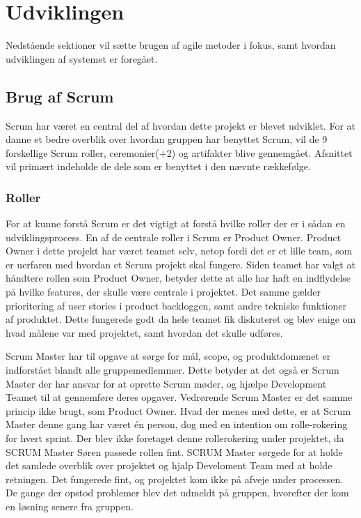 \chapter{Udviklingen}\label{ch:Udviklingen}
Nedstående sektioner vil sætte brugen af agile metoder i fokus, samt hvordan udviklingen af systemet er foregået.

\section{Brug af Scrum}

Scrum har været en central del af hvordan dette projekt er blevet udviklet.
For at danne et bedre overblik over hvordan gruppen har benyttet Scrum, vil de 9 forskellige Scrum roller, ceremonier(+2) og artifakter blive gennemgået. Afsnittet vil primært indeholde de dele som er benyttet i den nævnte rækkefølge.

\subsection{Roller}
For at kunne forstå Scrum er det vigtigt at forstå hvilke roller der er i sådan en udviklingsprocess.\cite{ScrumTrenches}
En af de centrale roller i Scrum er Product Owner. 
Product Owner i dette projekt har været teamet selv, netop fordi det er et lille team, som er uerfaren med hvordan et Scrum projekt skal fungere. Siden teamet har valgt at håndtere rollen som Product Owner, betyder dette at alle har haft en indflydelse på hvilke features, der skulle være centrale i projektet. Det samme gælder prioritering af user stories i product backloggen, samt andre tekniske funktioner af produktet. Dette fungerede godt da hele teamet fik diskuteret og blev enige om hvad målene var med projektet, samt hvordan det skulle udføres. 

Scrum Master har til opgave at sørge for mål, scope, og produktdomænet er indforstået blandt alle gruppemedlemmer. Dette betyder at det også er Scrum Master der har ansvar for at oprette Scrum møder, og hjælpe Development Teamet til at gennemføre deres opgaver. 
Vedrørende Scrum Master er det samme princip ikke brugt, som Product Owner. Hvad der menes med dette, er at Scrum Master denne gang har været én person, dog med en intention om rolle-rokering for hvert sprint. Der blev ikke foretaget denne rollerokering under projektet, da SCRUM Master Søren passede rollen fint. SCRUM Master sørgede for at holde det samlede overblik over projektet og hjalp Develoment Team med at holde retningen. Det fungerede fint, og projektet kom ikke på afveje under processen. De gange der opstod problemer blev det udmeldt på gruppen, hvorefter der kom en løsning senere fra gruppen.

